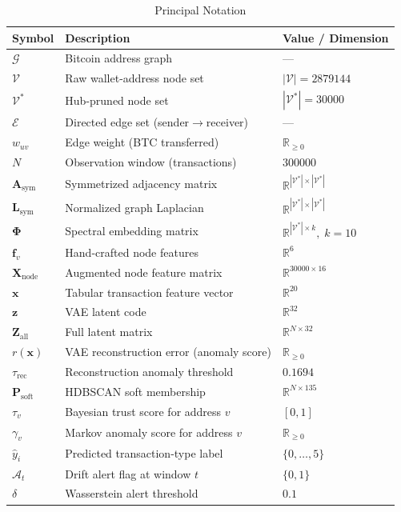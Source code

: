 \begin{table}[!t]
  \renewcommand{\arraystretch}{1.18}
  \caption{Principal Notation}
  \label{tab:notation}
  \centering
  \small
  \begin{tabular}{@{}lll@{}}
    \toprule
    \textbf{Symbol} & \textbf{Description} & \textbf{Value / Dimension} \\
    \midrule
    $\mathcal{G}$ & Bitcoin address graph & --- \\
    $\mathcal{V}$ & Raw wallet-address node set & $|\mathcal{V}|=\num{2879144}$ \\
    $\mathcal{V}^{*}$ & Hub-pruned node set & $|\mathcal{V}^{*}|=\num{30000}$ \\
    $\mathcal{E}$ & Directed edge set (sender$\to$receiver) & --- \\
    $w_{uv}$ & Edge weight (BTC transferred) & $\mathbb{R}_{\geq 0}$ \\
    $N$ & Observation window (transactions) & $\num{300000}$ \\
    $\mathbf{A}_{\mathrm{sym}}$ & Symmetrized adjacency matrix & $\mathbb{R}^{|\mathcal{V}^{*}|\times|\mathcal{V}^{*}|}$ \\
    $\mathbf{L}_{\mathrm{sym}}$ & Normalized graph Laplacian & $\mathbb{R}^{|\mathcal{V}^{*}|\times|\mathcal{V}^{*}|}$ \\
    $\boldsymbol{\Phi}$ & Spectral embedding matrix & $\mathbb{R}^{|\mathcal{V}^{*}|\times k},\;k=10$ \\
    $\mathbf{f}_{v}$ & Hand-crafted node features & $\mathbb{R}^{6}$ \\
    $\mathbf{X}_{\mathrm{node}}$ & Augmented node feature matrix & $\mathbb{R}^{\num{30000}\times 16}$ \\
    $\mathbf{x}$ & Tabular transaction feature vector & $\mathbb{R}^{20}$ \\
    $\mathbf{z}$ & VAE latent code & $\mathbb{R}^{32}$ \\
    $\mathbf{Z}_{\mathrm{all}}$ & Full latent matrix & $\mathbb{R}^{N\times 32}$ \\
    $r(\mathbf{x})$ & VAE reconstruction error (anomaly score) & $\mathbb{R}_{\geq 0}$ \\
    $\tau_{\mathrm{rec}}$ & Reconstruction anomaly threshold & $0.1694$ \\
    $\mathbf{P}_{\mathrm{soft}}$ & HDBSCAN soft membership & $\mathbb{R}^{N\times 135}$ \\
    $\tau_{v}$ & Bayesian trust score for address $v$ & $[0,1]$ \\
    $\gamma_{v}$ & Markov anomaly score for address $v$ & $\mathbb{R}_{\geq 0}$ \\
    $\hat{y}_{i}$ & Predicted transaction-type label & $\{0,\ldots,5\}$ \\
    $\mathcal{A}_{t}$ & Drift alert flag at window $t$ & $\{0,1\}$ \\
    $\delta$ & Wasserstein alert threshold & $0.1$ \\
    \bottomrule
  \end{tabular}
\end{table}

